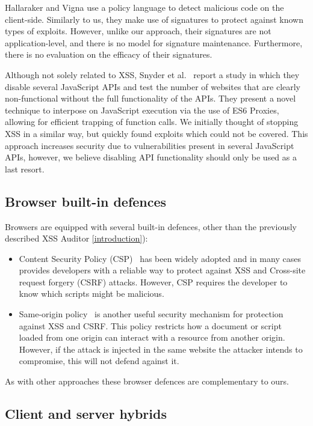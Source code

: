 Hallaraker and Vigna \cite{Hallaraker:2005:DMJ:1078029.1078861} use a policy language to detect malicious code on the client-side. Similarly to us, they make use of signatures to protect against known types of exploits. However, unlike our approach, their signatures are not application-level, and there is no model for signature maintenance. Furthermore, there is no evaluation on the efficacy of their signatures. 

Although not solely related to \ac{XSS}, Snyder et al.~\cite{Snyder:2017:MWD:3133956.3133966} report a study in which they disable several JavaScript APIs and test the number of websites that are clearly non-functional without the full functionality of the APIs. They present a novel technique to interpose on JavaScript execution via the use of ES6 Proxies, allowing for efficient trapping of function calls. We initially thought of stopping XSS in a similar way, but quickly found exploits which could not be covered. This approach increases security due to vulnerabilities present in several JavaScript APIs, however, we believe disabling API functionality should only be used as a last resort.

\subsection{Browser built-in defences}
Browsers are equipped with several built-in defences, other than the previously described XSS Auditor \ref{introduction}):
\begin{itemize}
	\item Content Security Policy (CSP)~\cite{CSP} has been widely adopted and in many cases provides developers with a reliable way to protect against \ac{XSS} and Cross-site request forgery (CSRF) attacks. However, CSP requires the developer to know which scripts might be malicious.
	\item Same-origin policy~\cite{SOP} is another useful security mechanism for protection against \ac{XSS} and CSRF. This policy restricts how a document or script loaded from one origin can interact with a resource from another origin. However, if the attack is injected in the same website the attacker intends to compromise, this will not defend against it.
\end{itemize}

As with other approaches these browser defences are complementary to ours.

\subsection{Client and server hybrids}

